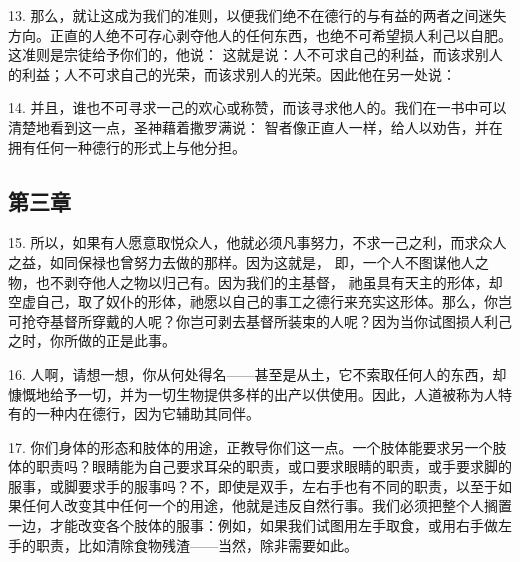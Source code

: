 13. 那么，就让这成为我们的准则，以便我们绝不在德行的与有益的两者之间迷失方向。正直的人绝不可存心剥夺他人的任何东西，也绝不可希望损人利己以自肥。这准则是宗徒给予你们的，他说： 这就是说：人不可求自己的利益，而该求别人的利益；人不可求自己的光荣，而该求别人的光荣。因此他在另一处说：\par

14. 并且，谁也不可寻求一己的欢心或称赞，而该寻求他人的。我们在一书中可以清楚地看到这一点，圣神藉着撒罗满说： 智者像正直人一样，给人以劝告，并在拥有任何一种德行的形式上与他分担。\par


\subsection{第三章}

\par

15. 所以，如果有人愿意取悦众人，他就必须凡事努力，不求一己之利，而求众人之益，如同保禄也曾努力去做的那样。因为这就是， 即，一个人不图谋他人之物，也不剥夺他人之物以归己有。因为我们的主基督， 祂虽具有天主的形体，却空虚自己，取了奴仆的形体，祂愿以自己的事工之德行来充实这形体。那么，你岂可抢夺基督所穿戴的人呢？你岂可剥去基督所装束的人呢？因为当你试图损人利己之时，你所做的正是此事。\par

16. 人啊，请想一想，你从何处得名——甚至是从土，它不索取任何人的东西，却慷慨地给予一切，并为一切生物提供多样的出产以供使用。因此，人道被称为人特有的一种内在德行，因为它辅助其同伴。\par

17. 你们身体的形态和肢体的用途，正教导你们这一点。一个肢体能要求另一个肢体的职责吗？眼睛能为自己要求耳朵的职责，或口要求眼睛的职责，或手要求脚的服事，或脚要求手的服事吗？不，即使是双手，左右手也有不同的职责，以至于如果任何人改变其中任何一个的用途，他就是违反自然行事。我们必须把整个人搁置一边，才能改变各个肢体的服事：例如，如果我们试图用左手取食，或用右手做左手的职责，比如清除食物残渣——当然，除非需要如此。\par

